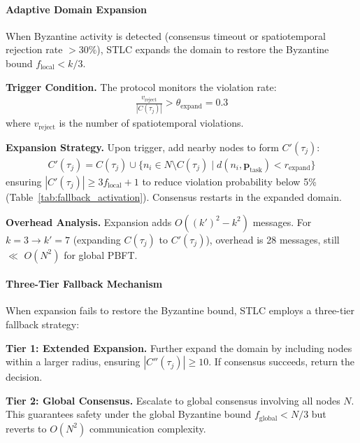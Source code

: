 \documentclass[lettersize,journal]{IEEEtran}
\begin{document}
\paragraph{Adaptive Domain Expansion}
\label{sec:adaptive_expansion}

When Byzantine activity is detected (consensus timeout or spatiotemporal
rejection rate $> 30\%$), STLC expands the domain to restore the Byzantine
bound $f_{\text{local}} < k/3$.

\textbf{Trigger Condition.} The protocol monitors the violation rate:
\begin{equation}
\begin{aligned}
\frac{v_{\text{reject}}}{|C(\tau_j)|} > \theta_{\text{expand}} = 0.3
\label{eq:expansion_trigger}
\end{aligned}
\end{equation}
where $v_{\text{reject}}$ is the number of spatiotemporal violations.

\textbf{Expansion Strategy.} Upon trigger, add nearby nodes to form
$C'(\tau_j)$:
\begin{equation}
\begin{aligned}
C'(\tau_j) = C(\tau_j) \cup
\{n_i \in N \setminus C(\tau_j) \mid
d(n_i, \mathbf{p}_{\text{task}}) < r_{\text{expand}}\}
\label{eq:domain_expansion}
\end{aligned}
\end{equation}
ensuring $|C'(\tau_j)| \geq 3f_{\text{local}} + 1$ to reduce violation probability
below 5\% (Table~\ref{tab:fallback_activation}). Consensus restarts in the expanded domain.

\textbf{Overhead Analysis.} Expansion adds $O((k')^2 - k^2)$ messages.
For $k=3 \to k'=7$ (expanding $C(\tau_j)$ to $C'(\tau_j)$), overhead is 28 messages,
still $\ll$ $O(N^2)$ for global PBFT.

\paragraph{Three-Tier Fallback Mechanism}
\label{sec:fallback}

When expansion fails to restore the Byzantine bound, STLC employs a three-tier fallback strategy:

\textbf{Tier 1: Extended Expansion.}
Further expand the domain by including nodes within a larger radius,
ensuring $|C''(\tau_j)| \geq 10$. If consensus succeeds, return the decision.

\textbf{Tier 2: Global Consensus.}
Escalate to global consensus involving all nodes $N$. This guarantees
safety under the global Byzantine bound $f_{\text{global}} < N/3$ but
reverts to $O(N^2)$ communication complexity.
\end{document}
